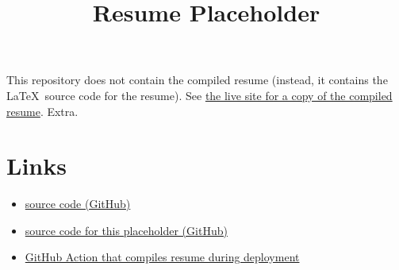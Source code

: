 \documentclass{article}
\title{\vspace{-7ex}Resume Placeholder}
\author{\vspace{-9ex}}
\date{\vspace{-9ex}}
\begin{document}
\maketitle
\thispagestyle{plain}

\noindent
This repository does not contain the compiled resume (instead, it contains the \LaTeX\ source code for the resume).
See \href{https://jazevedo.me/resume}{the live site for a copy of the compiled resume}. Extra.

\section{Links}
\begin{itemize}
    \item \href{https://github.com/jazeved0/jazevedo.me/tree/main/src/resume/main.tex}{source code (GitHub)}
    \item \href{https://github.com/jazeved0/jazevedo.me/tree/main/src/resume/placeholder.tex}{source code for this placeholder (GitHub)}
    \item \href{https://github.com/jazeved0/jazevedo.me/tree/main/.github/workflows/deploy.yaml}{GitHub Action that compiles resume during deployment}
\end{itemize}
\end{document}
